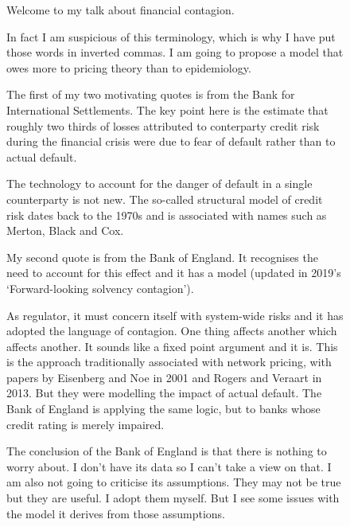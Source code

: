 \documentclass[a4paper,11pt]{article}
\begin{document}
  \begin{figure}[H]
    \begin{center}
    \end{center}
    \ttfamily
    Welcome to my talk about financial contagion.

    In fact I am suspicious of this terminology,
    which is why I have put those words in inverted commas.
    I am going to propose a model that owes more to pricing theory than to epidemiology.
  \end{figure}
  \begin{figure}[H]
    \begin{center}
    \end{center}
    \ttfamily
    The first of my two motivating quotes is from the Bank for International Settlements.
    The key point here is the estimate that roughly two thirds of losses attributed to conterparty credit risk
    during the financial crisis were due to fear of default rather than to actual default.

    The technology to account for the danger of default in a single counterparty is not new.
    The so-called structural model of credit risk dates back to the 1970s and is associated with
    names such as Merton, Black and Cox.
  \end{figure}
  \begin{figure}[H]
    \begin{center}
    \end{center}
    \ttfamily
    My second quote is from the Bank of England. It recognises the need to account for this effect and it has a model
    (updated in 2019's `Forward-looking solvency contagion').

    As regulator, it must concern itself with system-wide risks and it has adopted the language of contagion.
    One thing affects another which affects another. It sounds like a fixed point argument and it is.
    This is the approach traditionally associated with network pricing, with papers by Eisenberg and Noe in 2001 and Rogers and Veraart in 2013.
    But they were modelling the impact of actual default.
    The Bank of England is applying the same logic, but to banks whose credit rating is merely impaired.

    The conclusion of the Bank of England is that there is nothing to worry about.
    I don't have its data so I can't take a view on that.
    I am also not going to criticise its assumptions. They may not be true but they are useful. I adopt them myself.
    But I see some issues with the model it derives from those assumptions.
  \end{figure}
\end{document}
